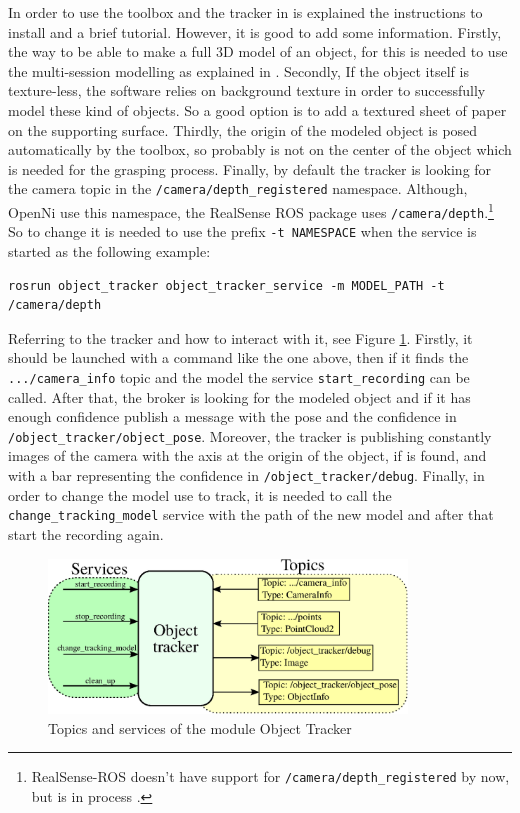 \documentclass[12pt,a4paper,final,twoside,openright]{report}
\begin{document}
\vspace{-5pt}
In order to use the toolbox and the tracker in \cite{gitV4RWrappers} is explained the instructions to install and a brief tutorial. However, it is good to add some information. Firstly, the way to be able to make a full 3D model of an object, for this is needed to use the multi-session modelling as explained in \cite{Prankl2015b}. Secondly, If the object itself is texture-less, the software relies on background texture in order to  successfully  model  these  kind  of  objects. So a good option is to add a textured sheet of paper on the supporting surface. Thirdly, the origin of the modeled object is posed automatically by the toolbox, so probably is not on the center of the object which is needed for the grasping process. Finally, by default the tracker is looking for the camera topic in the \texttt{/camera/depth\_registered} namespace. Although, OpenNi use this namespace, the RealSense ROS package uses \texttt{/camera/depth}.\footnote{RealSense-ROS doesn't have support for \texttt{/camera/depth\_registered} by now, but is in process \cite{gitRealSense}.} So to change it is needed to use the prefix \texttt{-t NAMESPACE} when the service is started as the following example:

\begin{lstlisting}[language=ROS]
rosrun object_tracker object_tracker_service -m MODEL_PATH -t /camera/depth
\end{lstlisting}

Referring to the tracker and how to interact with it, see Figure \ref{fig:Object_tracker}. Firstly, it should be launched with a command like the one above, then if it finds the \texttt{.../camera\_info} topic and the model the service \texttt{start\_recording} can be called. After that, the broker is looking for the modeled object and if it has enough confidence publish a message with the pose and the confidence in \texttt{/object\_tracker/object\_pose}. Moreover, the tracker is publishing constantly images of the camera with the axis at the origin of the object, if is found, and with a bar representing the confidence in \texttt{/object\_tracker/debug}. Finally, in order to change the model use to track, it is needed to call the \texttt{change\_tracking\_model} service with the path of the new model and after that start the recording again.

\begin{figure}[h]
\centering
\includegraphics[width=0.85\textwidth]{images/object_tracker.eps}
\caption{Topics and services of the module Object Tracker\label{fig:Object_tracker}}
\end{figure}
\end{document}
